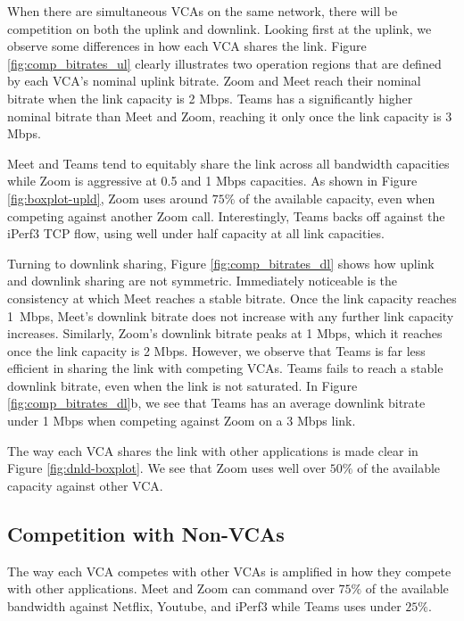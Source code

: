 When there are simultaneous VCAs on the same network, there will be competition on both the uplink and downlink. Looking first at the uplink, we observe some differences in how each VCA shares the link. Figure \ref{fig:comp_bitrates_ul} clearly illustrates two operation regions that are defined by each VCA's nominal uplink bitrate. Zoom and Meet reach their nominal bitrate when the link capacity is 2 Mbps. Teams has a significantly higher nominal bitrate than Meet and Zoom, reaching it only once the link capacity is 3 Mbps.

Meet and Teams tend to equitably share the link across all bandwidth capacities while Zoom is aggressive at 0.5 and 1 Mbps capacities. As shown in Figure \ref{fig:boxplot-upld}, Zoom uses around $75\%$ of the available capacity, even when competing against another Zoom call. Interestingly, Teams backs off against the iPerf3 TCP flow, using well under half capacity at all link capacities. 

Turning to downlink sharing, Figure \ref{fig:comp_bitrates_dl} shows how uplink and downlink sharing are not symmetric. Immediately noticeable is the consistency at which Meet reaches a stable bitrate.  Once the link capacity reaches 1~Mbps, Meet's downlink bitrate does not increase with any further link capacity increases. Similarly, Zoom's downlink bitrate peaks at 1 Mbps, which it reaches once the link capacity is 2 Mbps. However, we observe that Teams is far less efficient in sharing the link with competing VCAs. Teams fails to reach a stable downlink bitrate, even when the link is not saturated. In Figure \ref{fig:comp_bitrates_dl}b, we see that Teams has an average downlink bitrate under 1 Mbps when competing against Zoom on a 3 Mbps link. 

The way each VCA shares the link with other applications is made clear in Figure \ref{fig:dnld-boxplot}. We see that Zoom uses well over $50\%$ of the available capacity against other VCA.


\subsection{Competition with Non-VCAs}
The way each VCA competes with other VCAs is amplified in how they compete with other applications. Meet and Zoom can command over $75\%$ of the available bandwidth against Netflix, Youtube, and iPerf3 while Teams uses under $25\%$. 

